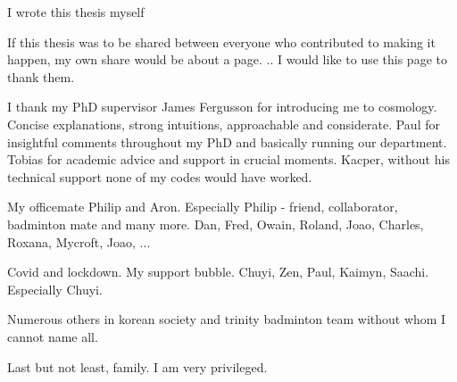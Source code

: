 
\begin{acknowledgements}      

I wrote this thesis myself 

If this thesis was to be shared between everyone who contributed to making it happen, my own share would be about a page. .. I would like to use this page to thank them.

I thank my PhD supervisor James Fergusson for introducing me to cosmology. Concise explanations, strong intuitions, approachable and considerate. Paul for insightful comments throughout my PhD and basically running our department. Tobias for academic advice and support in crucial moments. Kacper, without his technical support none of my codes would have worked.

My officemate Philip and Aron. Especially Philip - friend, collaborator, badminton mate and many more. Dan, Fred, Owain, Roland, Joao, Charles, Roxana, Mycroft, Joao, ...

Covid and lockdown. My support bubble. Chuyi, Zen, Paul, Kaimyn, Saachi. Especially Chuyi.

Numerous others in korean society and trinity badminton team without whom I cannot name all.

Last but not least, family. I am very privileged.


\end{acknowledgements}
